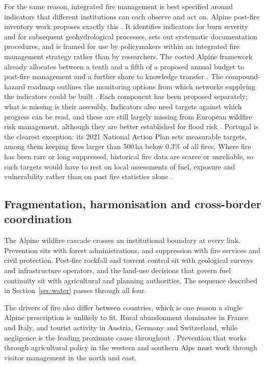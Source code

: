 \documentclass[11pt,a4paper]{article}
\begin{document}
For the same reason, integrated fire management is best specified around indicators that different institutions can each observe and act on. Alpine post-fire inventory work proposes exactly this \citep{melzner_wildfire-induced_2025}. It identifies indicators for burn severity and for subsequent geohydrological processes, sets out systematic documentation procedures, and is framed for use by policymakers within an integrated fire management strategy rather than by researchers. The costed Alpine framework already allocates between a tenth and a fifth of a proposed annual budget to post-fire management and a further share to knowledge transfer \citep{muller_forest_2020}. The compound-hazard roadmap outlines the monitoring options from which networks supplying the indicators could be built \citep{baselt_compound_2026}. Each component has been proposed separately; what is missing is their assembly. Indicators also need targets against which progress can be read, and these are still largely missing from European wildfire risk management, although they are better established for flood risk \citep{berchtold_towards_2025}. Portugal is the clearest exception: its 2021 National Action Plan sets measurable targets, among them keeping fires larger than 500\,ha below 0.3\% of all fires. Where fire has been rare or long suppressed, historical fire data are scarce or unreliable, so such targets would have to rest on local assessments of fuel, exposure and vulnerability rather than on past fire statistics alone \citep{berchtold_towards_2025}.

\subsection{Fragmentation, harmonisation and cross-border coordination}

The Alpine wildfire cascade crosses an institutional boundary at every link. Prevention sits with forest administrations, and suppression with fire services and civil protection. Post-fire rockfall and torrent control sit with geological surveys and infrastructure operators, and the land-use decisions that govern fuel continuity sit with agricultural and planning authorities. The sequence described in Section~\ref{sec:water} passes through all four.

The drivers of fire also differ between countries, which is one reason a single Alpine prescription is unlikely to fit. Rural abandonment dominates in France and Italy, and tourist activity in Austria, Germany and Switzerland, while negligence is the leading proximate cause throughout \citep{muller_forest_2020}. Prevention that works through agricultural policy in the western and southern Alps must work through visitor management in the north and east.
\end{document}
